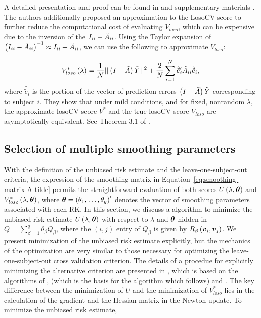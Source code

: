 \documentclass[../chapter-2-spline-representation.tex]{subfiles}
\begin{document}
A detailed presentation and proof can be found in \citet{xu2012asymptotic} and supplementary materials \citet{xuasymptotic}.  The authors additionally proposed an approximation to the LosoCV score to further reduce the computational cost of evaluating $V_{loso}$, which can be expensive due to the inversion of the $I_{ii} - \tilde{A}_{ii}$. Using the Taylor expansion of $\left(I_{ii} - \tilde{A}_{ii}\right)^{-1} \approx I_{ii} + \tilde{A}_{ii}$, we can use the following to approximate $V_{loso}$:

\begin{equation} \label{eq:approx-losocv}
V_{loso}^*\left( \lambda \right) = \frac{1}{N} \vert \vert \left(I - \tilde{A}\right)\tilde{Y} \vert \vert^2 + \frac{2}{N} \sum_{i = 1}^N \hat{\tilde{e}}'_{i}\tilde{A}_{ii}\hat{\tilde{e}}_i,
\end{equation}
\noindent
where $\hat{\tilde{e}}_i$ is the portion of the vector of prediction errors $\left(I - \tilde{A}\right)\tilde{Y}$ corresponding to subject $i$. They show that under mild conditions, and for fixed, nonrandom $\lambda$, the approximate losoCV score $V^*$ and the true losoCV score $V_{loso}$ are asymptotically equivalent. See Theorem 3.1 of \citet{xu2012asymptotic}.
  
\vspace{0.8in} 


\subsection{Selection of multiple smoothing parameters}

With the definition of the unbiased risk estimate and the leave-one-subject-out criteria, the expression of the smoothing matrix in Equation~\ref{eq:smoothing-matrix-A-tilde} permits the straightforward evaluation of both scores $U\left(\lambda, \mbox{\boldmath $\theta$} \right)$ and $V_{loso}^*\left(\lambda, \mbox{\boldmath $\theta$} \right)$, where $\mbox{\boldmath $\theta$} = \left(\theta_1,\dots, \theta_g\right)'$ denotes the vector of smoothing parameters associated with each RK.  In this section, we discuss a algorithm to minimize the unbiased risk estimate $U\left(\lambda, \mbox{\boldmath $\theta$}\right)$ with respect to $\lambda$ and $\mbox{\boldmath $\theta$}$ hidden in $Q = \sum_{\beta = 1}^q \theta_\beta Q_\beta$, where the $\left(i,j\right)$ entry of $Q_\beta$ is given by $R_\beta\left(\mbox{\boldmath $v$}_i,\mbox{\boldmath $v$}_j\right)$.  We present minimization of the unbiased risk estimate explicitly, but the mechanics of the optimization are very similar to those necessary for optimizing the leave-one-subject-out cross validation criterion. The details of a procedue for explicitly minimizing the alternative criterion are presented in \citet{xu2012asymptotic}, which is based on the algorithms of \citet{gu1991minimizing}, \citet{kim2004smoothing} (which is the basis for the algorithm which follows) and \citet{wood2004stable}. The key difference between the minimization of $U$ and the minimization of $V^*_{loso}$ lies in the calculation of the gradient and the Hessian matrix in the Newton update. To minimize the unbiased risk estimate,
\end{document}
